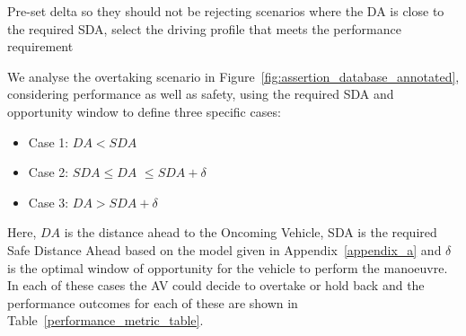 Pre-set delta so they should not be rejecting scenarios where the DA is close to the required SDA, select the driving profile that meets the performance requirement

We analyse the overtaking scenario in Figure~\ref{fig:assertion_database_annotated}, considering performance as well as safety, using the required SDA and opportunity window to define three specific cases:
\begin{itemize}

    \item Case 1: $DA < SDA$
    \item Case 2: $SDA \leq DA$ $\leq SDA + \delta$
    \item Case 3: $DA > SDA + \delta$
\end{itemize}
%
Here, $DA$ is the distance ahead to the Oncoming Vehicle,
SDA is the required Safe Distance Ahead based on the model given in Appendix~\ref{appendix_a} and $\delta$ is the optimal window of opportunity for the vehicle to perform the manoeuvre. 
%
In each of these cases the AV could decide to overtake or hold back and the performance outcomes for each of these are shown in Table~\ref{performance_metric_table}. 
%
